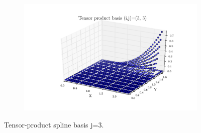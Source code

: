 \documentclass[11pt,letterpaper]{article}
\begin{document}
\begin{figure}[!tbh]
\begin{subfigure}[b]{.6\textwidth}
    \caption{}
    \label{fig4:label:c}
  \end{subfigure}
  \hfill
  \begin{subfigure}[b]{.6\textwidth}
    \includegraphics[width=\textwidth]{problem_2_2_3_3.pdf}
    \caption{}
    \label{fig4:label:d}
  \end{subfigure}
  \caption{Tensor-product spline basis j=3. }
  \end{figure}
\end{document}
